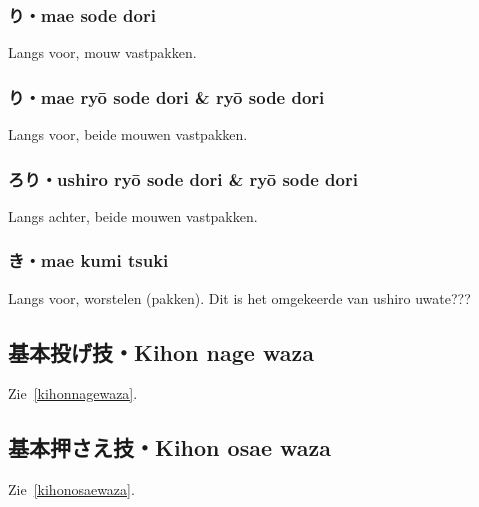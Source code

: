 \subsubsection{り・mae sode dori}
Langs voor, mouw vastpakken.

\subsubsection{り・mae ry\={o} sode dori & ry\={o} sode dori}
Langs voor, beide mouwen vastpakken.

\subsubsection{ろり・ushiro ry\={o} sode dori & ry\={o} sode dori}
Langs achter, beide mouwen vastpakken.

\subsubsection{き・mae kumi tsuki}
Langs voor, worstelen (pakken). Dit is het omgekeerde van ushiro uwate???

\subsection{基本投げ技・Kihon nage waza}
Zie~\ref{kihonnagewaza}.

\subsection{基本押さえ技・Kihon osae waza}
Zie~\ref{kihonosaewaza}.

